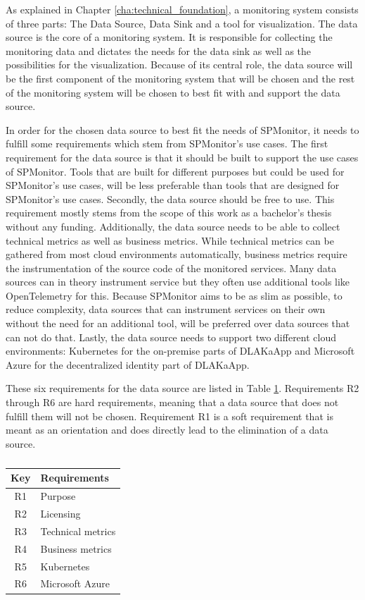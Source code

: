 As explained in Chapter \ref{cha:technical_foundation}, a monitoring system consists of three parts:
The Data Source, Data Sink and a tool for visualization.
The data source is the core of a monitoring system. It is responsible for collecting the monitoring data
and dictates the needs for the data sink as well as the possibilities for the visualization.
Because of its central role, the data source will be the first component of the monitoring system that will be chosen
and the rest of the monitoring system will be chosen to best fit with and support the data source.

In order for the chosen data source to best fit the needs of SPMonitor, it needs to fulfill some requirements
which stem from SPMonitor's use cases. The first requirement for the data source is that it should be built
to support the use cases of SPMonitor. Tools that are built for different purposes but could be used for SPMonitor's
use cases, will be less preferable than tools that are designed for SPMonitor's use cases.
Secondly, the data source should be free to use. This requirement mostly stems from the scope of this work
as a bachelor's thesis without any funding.
Additionally, the data source needs to be able to collect technical metrics as well as business metrics.
While technical metrics can be gathered from most cloud environments automatically, business metrics
require the instrumentation of the source code of the monitored services. Many data sources can in theory
instrument service but they often use additional tools like OpenTelemetry for this. Because SPMonitor aims
to be as slim as possible, to reduce complexity, data sources that can instrument services on their own without
the need for an additional tool, will be preferred over data sources that can not do that.
Lastly, the data source needs to support two different cloud environments: Kubernetes for the on-premise parts
of \Gls{DLAKaApp} and Microsoft Azure for the decentralized identity part of DLAKaApp.

These six requirements for the data source are listed in Table \ref{tab:data_source_requirements}.
Requirements R2 through R6 are hard requirements, meaning that a data source that does not fulfill them
will not be chosen. Requirement R1 is a soft requirement that is meant as an orientation and does directly
lead to the elimination of a data source.

\begin{table}[]
\centering
\begin{tabular}{c|l}
Key & Requirements \\
\hline
R1 & Purpose \\
R2 & Licensing \\
R3 & Technical metrics \\
R4 & Business metrics \\
R5 & Kubernetes \\
R6 & Microsoft Azure \\
\end{tabular}
\caption{}
\label{tab:data_source_requirements}
\end{table}

